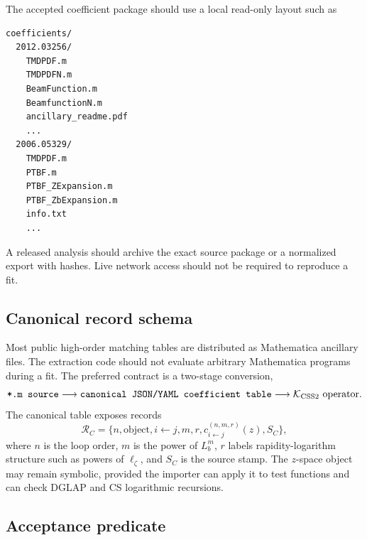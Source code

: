 \documentclass[11pt]{article}
\newcommand{\KCSS}{\mathcal K_{\rm CSS2}}
\begin{document}
The accepted coefficient package should use a local read-only layout such as
\begin{verbatim}
coefficients/
  2012.03256/
    TMDPDF.m
    TMDPDFN.m
    BeamFunction.m
    BeamfunctionN.m
    ancillary_readme.pdf
    ...
  2006.05329/
    TMDPDF.m
    PTBF.m
    PTBF_ZExpansion.m
    PTBF_ZbExpansion.m
    info.txt
    ...
\end{verbatim}
A released analysis should archive the exact source package or a normalized export with
hashes.  Live network access should not be required to reproduce a fit.

\subsection{Canonical record schema}

Most public high-order matching tables are distributed as Mathematica ancillary files.
The extraction code should not evaluate arbitrary Mathematica programs during a fit.  The
preferred contract is a two-stage conversion,
\begin{equation}
  \texttt{*.m\ source}
  \longrightarrow
  \texttt{canonical\ JSON/YAML\ coefficient\ table}
  \longrightarrow
  \KCSS\text{ operator} .
  \label{eq:mathematica-to-json-v15}
\end{equation}
The canonical table exposes records
\begin{equation}
  \mathcal R_C=\{n,\text{object},i\leftarrow j,m,r,
  c_{i\leftarrow j}^{(n,m,r)}(z),S_C\},
  \label{eq:canonical-record-v15}
\end{equation}
where $n$ is the loop order, $m$ is the power of $L_b^m$, $r$ labels rapidity-logarithm
structure such as powers of $\ell_\zeta$, and $S_C$ is the source stamp.  The $z$-space
object may remain symbolic, provided the importer can apply it to test functions and can
check DGLAP and CS logarithmic recursions.

\subsection{Acceptance predicate}
\end{document}
